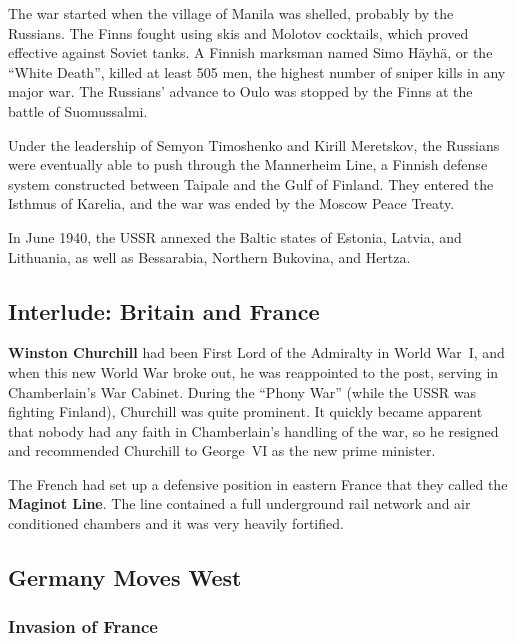 The war started when the village of Manila was shelled, probably by the Russians.
The Finns fought using skis and Molotov cocktails, which proved effective against Soviet tanks.
A Finnish marksman named Simo H\"ayh\"a, or the ``White Death'', killed at least 505 men,
the highest number of sniper kills in any major war.
The Russians' advance to Oulo was stopped by the Finns at the battle of Suomussalmi.

Under the leadership of Semyon Timoshenko and Kirill Meretskov,
the Russians were eventually able to push through the Mannerheim Line,
a Finnish defense system constructed between Taipale and the Gulf of Finland.
They entered the Isthmus of Karelia, and the war was ended by the Moscow Peace Treaty.

In June 1940, the USSR annexed the Baltic states of Estonia, Latvia, and Lithuania,
as well as Bessarabia, Northern Bukovina, and Hertza.

\subsection*{Interlude: Britain and France}

\textbf{Winston Churchill} had been First Lord of the Admiralty in World War~I,
and when this new World War broke out, he was reappointed to the post,
serving in Chamberlain's War Cabinet.
During the ``Phony War'' (while the USSR was fighting Finland), Churchill was quite prominent.
It quickly became apparent that nobody had any faith in Chamberlain's handling of the war,
so he resigned and recommended Churchill to George~VI as the new prime minister.

The French had set up a defensive position in eastern France
that they called the \textbf{Maginot Line}.
The line contained a full underground rail network
and air conditioned chambers and it was very heavily fortified.

\subsection*{Germany Moves West}

\subsubsection*{Invasion of France}

